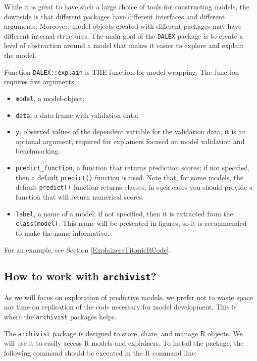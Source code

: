 \documentclass[12pt,]{krantz}
\providecommand{\tightlist}{%
  \setlength{\itemsep}{0pt}\setlength{\parskip}{0pt}}
\theoremstyle{definition}
\theoremstyle{definition}
\theoremstyle{definition}
\theoremstyle{remark}
\begin{document}
While it is great to have such a large choice of tools for constructing
models, the downside is that different packages have different
interfaces and different arguments. Moreover, model-objects created with
different packages may have different internal structures. The main goal
of the \texttt{DALEX} package \citep{R-DALEX} is to create a level of
abstraction around a model that makes it easier to explore and explain
the model.

Function \texttt{DALEX::explain} is THE function for model wrapping. The
function requires five arguments:

\begin{itemize}
\tightlist
\item
  \texttt{model}, a model-object;
\item
  \texttt{data}, a data frame with validation data;
\item
  \texttt{y}, observed values of the dependent variable for the
  validation data; it is an optional argument, required for explainers
  focused on model validation and benchmarking.
\item
  \texttt{predict\_function}, a function that returns prediction scores;
  if not specified, then a default \texttt{predict()} function is used.
  Note that, for some models, the default \texttt{predict()} function
  returns classes; in such cases you should provide a function that will
  return numerical scores.
\item
  \texttt{label}, a name of a model; if not specified, then it is
  extracted from the \texttt{class(model)}. This name will be presented
  in figures, so it is recommended to make the name informative.
\end{itemize}

For an example, see Section \ref{ExplainersTitanicRCode}.

\hypertarget{how-to-work-with-archivist}{%
\subsection{\texorpdfstring{How to work with
\texttt{archivist}?}{How to work with archivist?}}\label{how-to-work-with-archivist}}

As we will focus on exploration of predictive models, we prefer not to
waste space nor time on replication of the code necessary for model
development. This is where the \texttt{archivist} packages helps.

The \texttt{archivist} package \citep{archivist} is designed to store,
share, and manage R objects. We will use it to easily access R models
and explainers. To install the package, the following command should be
executed in the R command line:
\end{document}
